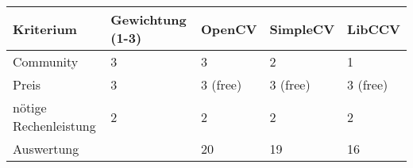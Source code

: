 \begin{table}[h]
\begin{tabular}{|p{4.5cm}|p{3.5cm}|p{2cm}|p{2cm}|p{2cm}|}\hline
	
	\textbf{Kriterium}	& 	\textbf{Gewichtung (1-3)} & \textbf{OpenCV} & \textbf{SimpleCV} & \textbf{LibCCV}\\\hline
	Community & 3 & 3 & 2 & 1\\\hline
	Preis & 3  & 3 (free)& 3 (free) & 3 (free) \\\hline
	nötige Rechenleistung & 2 & 2 & 2 & 2 \\\hline
	Auswertung &  & 20 & 19 & 16\\\hline
	
\end{tabular}\\
\end{table}
